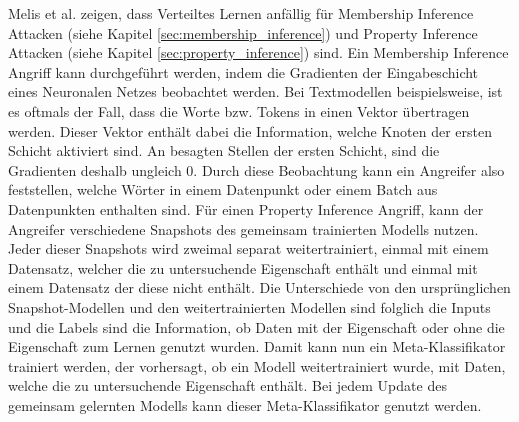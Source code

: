 Melis et al. \cite{P-82} zeigen, dass Verteiltes Lernen anfällig für Membership Inference Attacken (siehe Kapitel \ref{sec:membership_inference}) und Property Inference Attacken (siehe Kapitel \ref{sec:property_inference}) sind.
Ein Membership Inference Angriff kann durchgeführt werden, indem die Gradienten der Eingabeschicht eines Neuronalen Netzes beobachtet werden. 
Bei Textmodellen beispielsweise, ist es oftmals der Fall, dass die Worte bzw. Tokens in einen Vektor übertragen werden. 
Dieser Vektor enthält dabei die Information, welche Knoten der ersten Schicht aktiviert sind. 
An besagten Stellen der ersten Schicht, sind die Gradienten deshalb ungleich 0.
Durch diese Beobachtung kann ein Angreifer also feststellen, welche Wörter in einem Datenpunkt oder einem Batch aus Datenpunkten enthalten sind.
Für einen Property Inference Angriff, kann der Angreifer verschiedene Snapshots des gemeinsam trainierten Modells nutzen. 
Jeder dieser Snapshots wird zweimal separat weitertrainiert, einmal mit einem Datensatz, welcher die zu untersuchende Eigenschaft enthält und einmal mit einem Datensatz der diese nicht enthält.
Die Unterschiede von den ursprünglichen Snapshot-Modellen und den weitertrainierten Modellen sind folglich die Inputs und die Labels sind die Information, ob Daten mit der Eigenschaft oder ohne die Eigenschaft zum Lernen genutzt wurden.
Damit kann nun ein Meta-Klassifikator trainiert werden, der vorhersagt, ob ein Modell weitertrainiert wurde, mit Daten, welche die zu untersuchende Eigenschaft enthält.
Bei jedem Update des gemeinsam gelernten Modells kann dieser Meta-Klassifikator genutzt werden.


